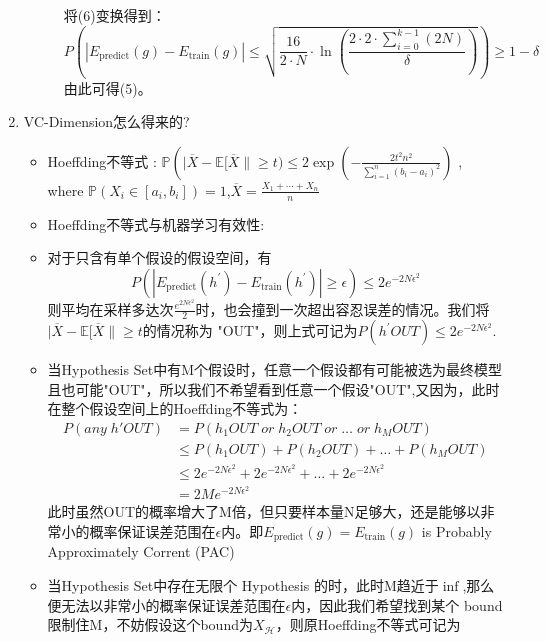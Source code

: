 \documentclass[UTF8]{article}%
\begin{document}
\begin{enumerate}
\begin{description}
					将(6)变换得到：
					\begin{equation}
					P\left( | E_{\text {predict}}(g)-E_{\text {train}}(g) | \leq  \sqrt{\frac{16}{2 \cdot N} \cdot \ln (\frac{2 \cdot 2 \cdot \sum\limits_{i=0}^{k-1}(2 N)}{\delta})} \right) \geq 1- \delta
					\end{equation}\label{7}
					由此可得(5)。
				\end{description}
			\item VC-Dimension怎么得来的?
			\begin{itemize}
				\item Hoeffding不等式 :  $\mathbb{P}\left( | \overline{X}-\mathbb{E}[\overline{X} \| \geq t) \leq 2 \exp \left(-\frac{2 t^{2} n^{2}}{\sum_{i=1}^{n}\left(b_{i}-a_{i}\right)^{2}}\right)\right.$ ,\\where $\mathbb{P}\left(X_{i} \in\left[a_{i}, b_{i}\right]\right)=1$,$\overline{X}=\frac{X_{1}+\cdots+X_{n}}{n}$
				\item Hoeffding不等式与机器学习有效性:
				\item 对于只含有单个假设的假设空间，有
				$$
				P\left( | E_{\text {predict}}\left(h^{\prime}\right)-E_{\text {train}}\left(h^{\prime}\right) | \geq \epsilon\right) \leq 2 e^{-2 N \epsilon^{2}}
				$$
				则平均在采样多达次$\frac{e^{2 N \epsilon^{2}}}{2}$时，也会撞到一次超出容忍误差的情况。我们将$ | \overline{X}-\mathbb{E}[\overline{X} \| \geq t$的情况称为 "OUT"，则上式可记为$P(h^{'}{OUT})\leq 2 e^{-2 N \epsilon^{2}}$.\\
				\item 当Hypothesis Set中有M个假设时，任意一个假设都有可能被选为最终模型且也可能"OUT"，所以我们不希望看到任意一个假设"OUT",又因为，此时在整个假设空间上的Hoeffding不等式为：
				\begin{equation}
				\begin{aligned} P(any\; h' OUT) &=P(h_1 OUT \; or \;  h_2 OUT \; or \;\dots\; or \; h_M OUT)\\ 
				&\leq P(h_1 OUT) + P(h_2 OUT) + \dots +  P(h_M OUT)\\
				&\leq 2 e^{-2 N \epsilon^{2}}+ 2 e^{-2 N \epsilon^{2}} +\dots +2 e^{-2 N \epsilon^{2}}\\
				&= 2Me^{-2 N \epsilon^{2}}
				\end{aligned} 
				\end{equation}
				此时虽然\;OUT的概率增大了M倍，但只要样本量N足够大，还是能够以非常小的概率保证误差范围在$\epsilon$内。即$E_{\text {predict}}(g)=E_{\text {train}}(g)$ is Probably Approximately Corrent (PAC)
				\item 当Hypothesis Set中存在无限个 Hypothesis 的时，此时M趋近于$\inf$,那么便无法以非常小的概率保证误差范围在$\epsilon$内，因此我们希望找到某个 bound 限制住M，不妨假设这个bound为$X_{\mathcal{H}}$，则原Hoeffding不等式可记为

\end{itemize}
\end{enumerate}
\end{document}
